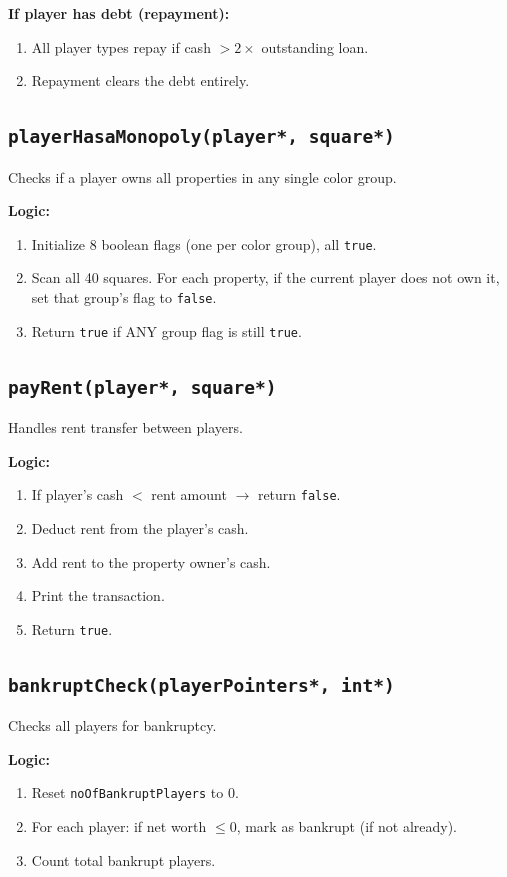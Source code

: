 \documentclass[12pt,a4paper]{article}
\begin{document}
\textbf{If player has debt (repayment):}
\begin{enumerate}[noitemsep]
    \item All player types repay if cash $> 2 \times$ outstanding loan.
    \item Repayment clears the debt entirely.
\end{enumerate}

\subsection{\texttt{playerHasaMonopoly(player*, square*)}}
Checks if a player owns all properties in any single color group.

\textbf{Logic:}
\begin{enumerate}[noitemsep]
    \item Initialize 8 boolean flags (one per color group), all \texttt{true}.
    \item Scan all 40 squares. For each property, if the current player does not own it, set that group's flag to \texttt{false}.
    \item Return \texttt{true} if ANY group flag is still \texttt{true}.
\end{enumerate}

\subsection{\texttt{payRent(player*, square*)}}
Handles rent transfer between players.

\textbf{Logic:}
\begin{enumerate}[noitemsep]
    \item If player's cash $<$ rent amount $\rightarrow$ return \texttt{false}.
    \item Deduct rent from the player's cash.
    \item Add rent to the property owner's cash.
    \item Print the transaction.
    \item Return \texttt{true}.
\end{enumerate}

\subsection{\texttt{bankruptCheck(playerPointers*, int*)}}
Checks all players for bankruptcy.

\textbf{Logic:}
\begin{enumerate}[noitemsep]
    \item Reset \texttt{noOfBankruptPlayers} to 0.
    \item For each player: if net worth $\leq 0$, mark as bankrupt (if not already).
    \item Count total bankrupt players.
\end{enumerate}
\end{document}
